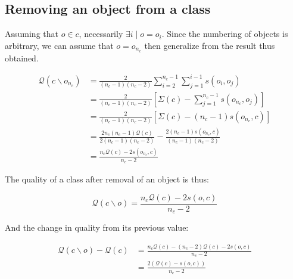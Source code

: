 \documentclass[a4paper,twoside]{article}
\begin{document}
\subsection{Removing an object from a class}

Assuming that $o \in c$, necessarily $\exists i \mid o=o_i$. Since the
numbering of objects is arbitrary, we can assume that $o = o_{n_c}$
then generalize from the result thus obtained.

\begin{equation}
  \begin{aligned}
    \mathcal{Q}\left(c \smallsetminus o_{n_c}\right) & = \frac{2}{(n_c-1)(n_c-2)} \sum_{i=2}^{n_c-1} \sum_{j=1}^{i-1} s\left(o_i, o_j\right) \\
                                                   & = \frac{2}{(n_c-1)(n_c-2)} \left[\Sigma(c) - \sum_{j=1}^{n_c-1} s\left(o_{n_c}, o_j\right) \right] \\
                                                   & = \frac{2}{(n_c-1)(n_c-2)} \left[\Sigma(c) - (n_c-1)s\left(o_{n_c}, c\right) \right] \\
                                                   & = \frac{2n_c(n_c-1)\mathcal{Q}(c)}{2(n_c-1)(n_c-2)} - \frac{2(n_c-1)s\left(o_{n_c}, c\right)}{(n_c-1)(n_c-2)}\\
                                                   & = \frac{n_c \mathcal{Q}(c)  - 2s\left(o_{n_c}, c\right)}{n_c-2}
  \end{aligned}
\end{equation}

The quality of a class after removal of an object is thus:

\begin{equation}
  \mathcal{Q}\left(c \smallsetminus o\right) = \frac{n_c \mathcal{Q}(c)  - 2s\left(o, c\right)}{n_c-2}
\end{equation}

And the change in quality from its previous value:

\begin{equation} \label{deltaRemove}
  \begin{aligned}
    \mathcal{Q}\left(c \smallsetminus o\right) - \mathcal{Q}\left(c\right) & = \frac{n_c \mathcal{Q}(c)  - (n_c-2) \mathcal{Q}(c)  - 2s\left(o, c\right)}{n_c-2} \\
                                                                           & = \frac{2\left( \mathcal{Q}(c) - s\left(o, c\right)\right)}{n_c-2}
    \end{aligned}
\end{equation}
\end{document}

